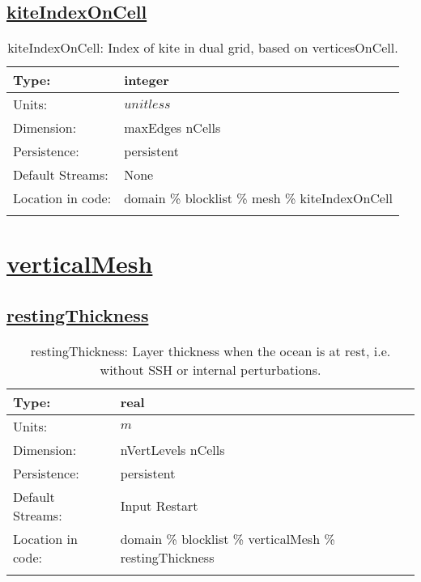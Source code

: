\subsection[kiteIndexOnCell]{\hyperref[sec:var_tab_mesh]{kiteIndexOnCell}}
\label{subsec:var_sec_mesh_kiteIndexOnCell}
\begin{center}
\begin{longtable}{| p{2.0in} | p{4.0in} |}
        \hline 
        Type: & integer \\
        \hline 
        Units: & $unitless$ \\
        \hline 
        Dimension: & maxEdges nCells \\
        \hline 
        Persistence: & persistent \\
        \hline 
		 Default Streams: & None \\
        \hline 
		 Location in code: & domain \% blocklist \% mesh \% kiteIndexOnCell \\
		 \hline 
    \caption{kiteIndexOnCell: Index of kite in dual grid, based on verticesOnCell.}
\end{longtable}
\end{center}
\section[verticalMesh]{\hyperref[sec:var_tab_verticalMesh]{verticalMesh}}
\label{sec:var_sec_verticalMesh}
\subsection[restingThickness]{\hyperref[sec:var_tab_verticalMesh]{restingThickness}}
\label{subsec:var_sec_verticalMesh_restingThickness}
\begin{center}
\begin{longtable}{| p{2.0in} | p{4.0in} |}
        \hline 
        Type: & real \\
        \hline 
        Units: & $m$ \\
        \hline 
        Dimension: & nVertLevels nCells \\
        \hline 
        Persistence: & persistent \\
        \hline 
		 Default Streams: & Input Restart  \\
        \hline 
		 Location in code: & domain \% blocklist \% verticalMesh \% restingThickness \\
		 \hline 
    \caption{restingThickness: Layer thickness when the ocean is at rest, i.e. without SSH or internal perturbations.}
\end{longtable}
\end{center}
